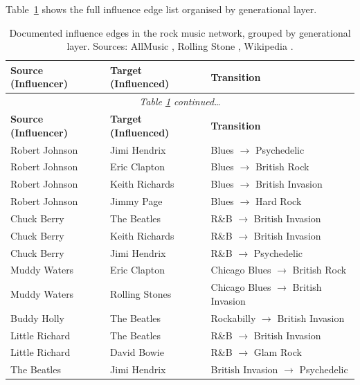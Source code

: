 \documentclass[12pt, a4paper]{article}
\begin{document}
Table~\ref{tab:full_edges} shows the full influence edge list
organised by generational layer.

\begin{longtable}{p{4.2cm} p{4.2cm} p{3cm}}
\caption{Documented influence edges in the rock music network,
  grouped by generational layer. Sources: AllMusic
  \citep{allmusic2024}, Rolling Stone \citep{rollingstoneartists},
  Wikipedia \citep{wikifluence2024}.}
\label{tab:full_edges}\\
\toprule
\textbf{Source (Influencer)} & \textbf{Target (Influenced)} &
\textbf{Transition} \\
\midrule
\endfirsthead
\multicolumn{3}{c}{\small\textit{Table \ref{tab:full_edges}
  continued\ldots}}\\
\toprule
\textbf{Source (Influencer)} & \textbf{Target (Influenced)} &
\textbf{Transition} \\
\midrule
\endhead
\bottomrule
\endfoot
Robert Johnson      & Jimi Hendrix           & Blues $\to$ Psychedelic \\
Robert Johnson      & Eric Clapton           & Blues $\to$ British Rock \\
Robert Johnson      & Keith Richards         & Blues $\to$ British Invasion \\
Robert Johnson      & Jimmy Page             & Blues $\to$ Hard Rock \\
Chuck Berry         & The Beatles            & R\&B $\to$ British Invasion \\
Chuck Berry         & Keith Richards         & R\&B $\to$ British Invasion \\
Chuck Berry         & Jimi Hendrix           & R\&B $\to$ Psychedelic \\
Muddy Waters        & Eric Clapton           & Chicago Blues $\to$ British Rock \\
Muddy Waters        & Rolling Stones         & Chicago Blues $\to$ British Invasion \\
Buddy Holly         & The Beatles            & Rockabilly $\to$ British Invasion \\
Little Richard      & The Beatles            & R\&B $\to$ British Invasion \\
Little Richard      & David Bowie            & R\&B $\to$ Glam Rock \\
The Beatles         & Jimi Hendrix           & British Invasion $\to$ Psychedelic \\

\end{longtable}
\end{document}
